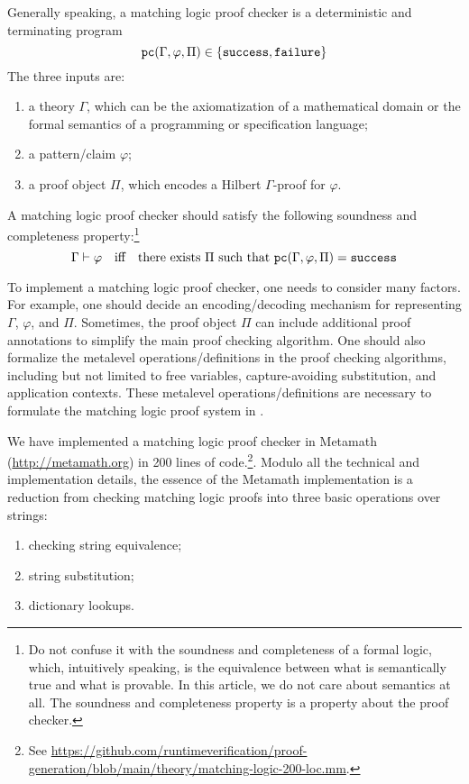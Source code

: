 \documentclass{article}
\begin{document}
Generally speaking, 
a matching logic proof checker is a deterministic and terminating program
\begin{equation}
\textnormal{\texttt{pc}}(\Gamma, \varphi, \Pi) \in \{\textnormal{\texttt{success}}, \textnormal{\texttt{failure}}\}
\end{equation}
The three inputs are:
\begin{enumerate}
\item a theory $\Gamma$, which can be the axiomatization of a mathematical domain or the formal semantics of a programming or specification language; 
\item a pattern/claim $\varphi$;
\item a proof object $\Pi$, 
      which encodes a Hilbert $\Gamma$-proof for $\varphi$.
\end{enumerate}
A matching logic proof checker should satisfy the following
soundness and completeness property:\footnote{Do not confuse it 
with the soundness and completeness of a formal logic, which, intuitively speaking, 
is the equivalence between what is semantically true and what is provable. In this article, we do not care about semantics at all. The soundness and completeness property is a property about the proof checker.}
\begin{equation}
\label{eq:pc_sound_complete}
\Gamma \vdash \varphi
\quad\text{iff}\quad
\text{there exists $\Pi$ such that $\textnormal{\texttt{pc}}(\Gamma, \varphi, \Pi) = \textnormal{\texttt{success}}$}
\end{equation}

To implement a matching logic proof checker,
one needs to consider many factors. 
For example, one should decide an encoding/decoding mechanism for 
representing $\Gamma$, $\varphi$, and $\Pi$.
Sometimes, the proof object $\Pi$ can include additional
proof annotations to simplify the main proof checking algorithm. 
One should also formalize the metalevel operations/definitions
in the proof checking algorithms, including but not limited to
free variables, capture-avoiding substitution, and application contexts.
These metalevel operations/definitions are necessary to formulate the
matching logic proof system in . 

We have implemented a matching logic proof checker in Metamath
(\url{http://metamath.org})
in 200 lines of code.\footnote{See \url{https://github.com/runtimeverification/proof-generation/blob/main/theory/matching-logic-200-loc.mm}.}.  
Modulo all the technical and implementation details, 
the essence of the Metamath implementation is a reduction 
from checking matching logic proofs into three basic operations
over strings:
\begin{enumerate}
\item checking string equivalence;
\item string substitution; 
\item dictionary lookups.
\end{enumerate}
\end{document}
